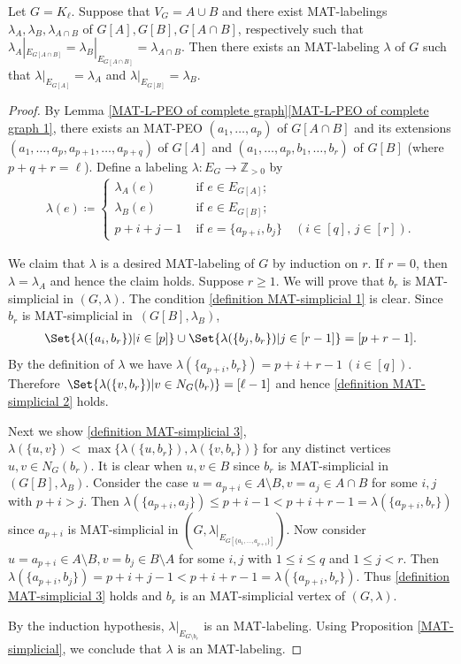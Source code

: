 \begin{lemma}\label{merge}
Let $ G = K_{\ell} $. 
Suppose that $ V_{G} = A \cup B $ and there exist MAT-labelings $ \lambda_{A}, \lambda_{B}, \lambda_{A \cap B} $ of $ G[A], G[B], G[A\cap B] $, respectively such that $ \lambda_{A}|_{E_{G[A\cap B]}} = \lambda_{B}|_{E_{G[A\cap B]}} = \lambda_{A \cap B} $. 
Then there exists an MAT-labeling $ \lambda $ of $ G $ such that $ \lambda|_{E_{G[A]}} = \lambda_{A} $ and $ \lambda|_{E_{G[B]}} = \lambda_{B} $. 
\end{lemma}
\begin{proof}
By Lemma \ref{MAT-L-PEO of complete graph}\ref{MAT-L-PEO of complete graph 1}, there exists an MAT-PEO $ (a_{1}, \dots, a_{p}) $ of $ G[A \cap B] $ and its extensions $ (a_{1}, \dots, a_{p}, a_{p+1}, \dots, a_{p+q}) $ of $ G[A] $ and $ (a_{1}, \dots, a_{p}, b_{1}, \dots, b_{r}) $ of $ G[B] $ (where $p+q+r=\ell$). 
Define a labeling $ \lambda \colon E_{G} \to \mathbb{Z}_{>0} $ by 
\begin{align*}
\lambda(e) \coloneqq \begin{cases}
\lambda_{A}(e) & \text{ if } e \in E_{G[A]}; \\
\lambda_{B}(e) & \text{ if } e \in E_{G[B]}; \\
p + i + j - 1 & \text{ if } e = \{a_{p+i}, b_{j}\} \quad (i \in [q], \,  j \in[  r]). 
\end{cases}
\end{align*}

We claim that $ \lambda $ is a desired MAT-labeling of $ G $ by induction on $ r $. 
If $ r = 0 $, then $ \lambda = \lambda_{A} $ and hence the claim holds. 
Suppose $ r \geq 1 $. 
We will prove that $ b_{r} $ is MAT-simplicial in $ (G, \lambda) $. 
The condition \ref{definition MAT-simplicial 1} is clear. 
Since $ b_{r} $ is MAT-simplicial in~$ (G[B], \lambda_{B}) $, 
\begin{align*}
\Set{\lambda(\{a_{i}, b_{r}\}) | i \in [p ] } \cup \Set{\lambda(\{b_{j}, b_{r}\}) | j \in[  r-1]} =[ p+r-1]. 
\end{align*}
By the definition of $ \lambda $ we have $ \lambda(\{a_{p+i}, b_{r}\}) = p+i+r-1 \ (i \in [q]) $. 
Therefore~$ \Set{\lambda(\{v,b_{r}\}) | v \in N_{G}(b_{r})} = [\ell - 1] $ and hence \ref{definition MAT-simplicial 2} holds. 

Next we show \ref{definition MAT-simplicial 3}, \ie  $ \lambda(\{u,v\}) < \max\{\lambda(\{u,b_{r}\}), \lambda(\{v,b_{r}\})\} $ for any distinct vertices $ u,v \in N_{G}(b_{r}) $. 
It is clear when $ u,v \in B $ since $ b_{r} $ is MAT-simplicial in~$ (G[B], \lambda_{B}) $. 
Consider the case $ u=a_{p+i} \in A\setminus B, v=a_{j} \in A \cap B$ for some $ i,j $ with $ p+i > j $. 
Then $ \lambda(\{a_{p+i}, a_{j}\}) \leq p+i-1 < p+i+r-1 = \lambda(\{a_{p+i}, b_{r}\}) $ since $ a_{p+i} $ is MAT-simplicial in $ (G, \lambda|_{E_{G[\{a_{1}, \dots, a_{p+i}\}]}}) $. 
Now consider $ u=a_{p+i} \in A\setminus B, v = b_{j} \in B\setminus A $ for some $ i,j $ with $ 1 \leq i \leq q $ and $ 1 \leq j < r $. 
Then $ \lambda(\{a_{p+i}, b_{j}\}) = p+i+j-1 < p+i+r-1 = \lambda(\{a_{p+i}, b_{r}\}) $. 
Thus \ref{definition MAT-simplicial 3} holds and $ b_{r} $ is an MAT-simplicial vertex of $ (G, \lambda) $. 

By the induction hypothesis, $ \lambda|_{E_{G\setminus b_{r}}} $ is an MAT-labeling. 
Using Proposition \ref{MAT-simplicial}, we conclude that $ \lambda $ is an MAT-labeling. 
\end{proof}
